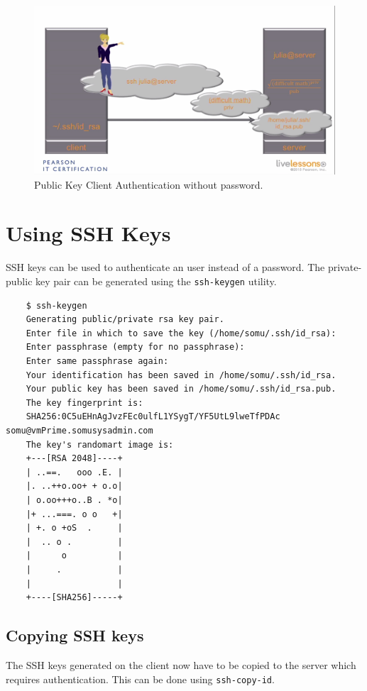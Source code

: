 \documentclass{report}
\begin{document}
	\begin{figure}[H]
		\centering
		\includegraphics[width=0.9\linewidth]{"1.5.b Client auth with no password"}
		\caption{Public Key Client Authentication without password.}
		\label{fig:1}
	\end{figure}

	\section{Using SSH Keys}
	SSH keys can be used to authenticate an user instead of a password. The private-public key pair can be generated using the \verb|ssh-keygen| utility.
	
	\begin{verbatim}
	$ ssh-keygen
	Generating public/private rsa key pair.
	Enter file in which to save the key (/home/somu/.ssh/id_rsa): 
	Enter passphrase (empty for no passphrase): 
	Enter same passphrase again: 
	Your identification has been saved in /home/somu/.ssh/id_rsa.
	Your public key has been saved in /home/somu/.ssh/id_rsa.pub.
	The key fingerprint is:
	SHA256:0C5uEHnAgJvzFEc0ulfL1YSygT/YF5UtL9lweTfPDAc somu@vmPrime.somusysadmin.com
	The key's randomart image is:
	+---[RSA 2048]----+
	| ..==.   ooo .E. |
	|. ..++o.oo+ + o.o|
	| o.oo+++o..B . *o|
	|+ ...===. o o   +|
	| +. o +oS  .     |
	|  .. o .         |
	|      o          |
	|     .           |
	|                 |
	+----[SHA256]-----+
	\end{verbatim}
	
	\subsection{Copying SSH keys}
	
	The SSH keys generated on the client now have to be copied to the server which requires authentication. This can be done using \verb|ssh-copy-id|.
	
\end{document}
